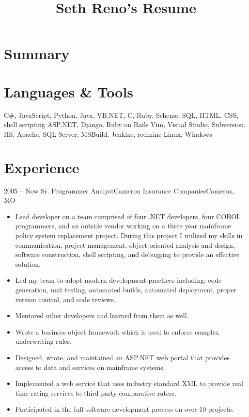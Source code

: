 \documentclass[11pt,letterpaper,final]{moderncv}
\title{Seth Reno's Resume}
\begin{document}
\maketitle
\section{Summary}

\section{Languages \& Tools} 
{C\#, JavaScript, Python, Java, VB.NET, C, Ruby, Scheme, SQL, HTML, CSS, shell scripting}
{ASP.NET, Django, Ruby on Rails} 
{Vim, Visual Studio, Subversion, IIS, Apache, SQL Server, MSBuild, Jenkins, redmine}
{Linux, Windows}

\section{Experience} 
	\cventry
{2005 -- Now} {Sr. Programmer Analyst}{Cameron Insurance Companies}{Cameron, MO}{}{
		\begin{itemize}
			\item 
Lead developer on a team comprised of four .NET developers, four COBOL programmers, and an outside
vendor working on a three year mainframe policy system replacement project. During this project I
utilized my skills in communication, project management, object oriented analysis and design, software
construction, shell scripting, and debugging to provide an effective solution.
			\item 
Led my team to adopt modern development practices including: code generation, unit testing,
automated builds, automated deployment, proper version control, and code reviews.
			\item 
Mentored other developers and learned from them as well.
			\item 
Wrote a business object framework which is used to enforce complex underwriting rules.
			\item 
Designed, wrote, and maintained an ASP.NET web portal that provides access to data and services on
mainframe systems.
			\item 
Implemented a web service that uses industry standard XML to provide real time rating services to third
party comparative raters.
			\item 
Participated in the full software development process on over 10 projects.
		\end{itemize}
}
\end{document}

